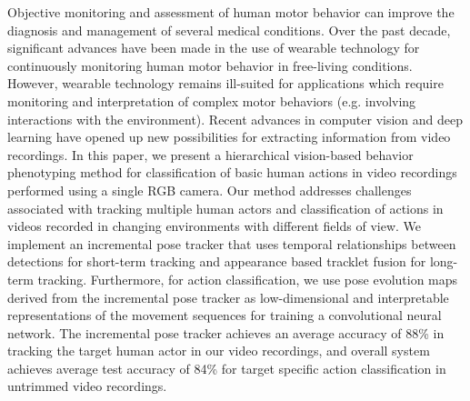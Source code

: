Objective monitoring and assessment of human motor behavior can improve the diagnosis and management of several medical conditions. Over the past decade, significant advances have been made in the use of wearable technology for continuously monitoring human motor behavior in free-living conditions. However, wearable technology remains ill-suited for applications which require monitoring and interpretation of complex motor behaviors (e.g. involving interactions with the environment). Recent advances in computer vision and deep learning have opened up new possibilities for extracting information from video recordings. In this paper, we present a hierarchical vision-based behavior phenotyping method for classification of basic human actions in video recordings performed using a single RGB camera. Our method addresses challenges associated with tracking multiple human actors and classification of actions in videos recorded in changing environments with different fields of view. We implement an incremental pose tracker that uses temporal relationships between detections for short-term tracking and appearance based tracklet fusion for long-term tracking. Furthermore, for action classification, we use pose evolution maps derived from the incremental pose tracker as low-dimensional and interpretable representations of the movement sequences for training a convolutional neural network. The incremental pose tracker achieves an average accuracy of 88\% in tracking the target human actor in our video recordings, and overall system achieves average test accuracy of 84\% for target specific action classification in untrimmed video recordings.



